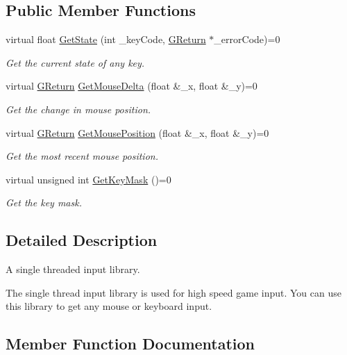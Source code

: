 \subsection*{Public Member Functions}
\begin{DoxyCompactItemize}
\item 
virtual float \hyperlink{classGW_1_1SYSTEM_1_1GInput_adde23f6e5640e8143e7e7835ee9774ec}{Get\+State} (int \+\_\+key\+Code, \hyperlink{namespaceGW_a67a839e3df7ea8a5c5686613a7a3de21}{G\+Return} $\ast$\+\_\+error\+Code)=0
\begin{DoxyCompactList}\small\item\em Get the current state of any key. \end{DoxyCompactList}\item 
virtual \hyperlink{namespaceGW_a67a839e3df7ea8a5c5686613a7a3de21}{G\+Return} \hyperlink{classGW_1_1SYSTEM_1_1GInput_a775fca7ad71371f369e3ad69fb32603a}{Get\+Mouse\+Delta} (float \&\+\_\+x, float \&\+\_\+y)=0
\begin{DoxyCompactList}\small\item\em Get the change in mouse position. \end{DoxyCompactList}\item 
virtual \hyperlink{namespaceGW_a67a839e3df7ea8a5c5686613a7a3de21}{G\+Return} \hyperlink{classGW_1_1SYSTEM_1_1GInput_a351eb04ac4a8699f6e4e416860d264b2}{Get\+Mouse\+Position} (float \&\+\_\+x, float \&\+\_\+y)=0
\begin{DoxyCompactList}\small\item\em Get the most recent mouse position. \end{DoxyCompactList}\item 
virtual unsigned int \hyperlink{classGW_1_1SYSTEM_1_1GInput_a071a399bc9c400f0cd333958d911c8c2}{Get\+Key\+Mask} ()=0
\begin{DoxyCompactList}\small\item\em Get the key mask. \end{DoxyCompactList}\end{DoxyCompactItemize}


\subsection{Detailed Description}
A single threaded input library. 

The single thread input library is used for high speed game input. You can use this library to get any mouse or keyboard input. 

\subsection{Member Function Documentation}
